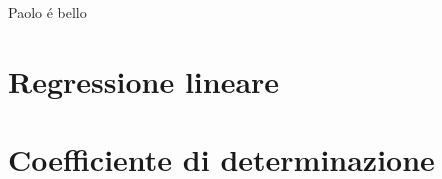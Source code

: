 \documentclass{article}
\begin{document}
%

\begin{thebibliography}{1}

 Paolo \'e bello

\end{thebibliography}


\begin{appendices}
\makeatletter
{}
\makeatother
	
  	\section{Regressione lineare}
	
	\section{Coefficiente di determinazione}
	
\end{appendices}

\end{document}
